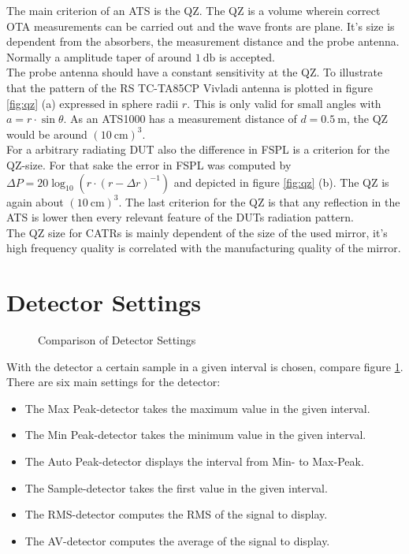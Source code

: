The main criterion of an \ac{ATS} is the \ac{QZ}. The \ac{QZ} is a volume wherein correct \ac{OTA} measurements can be carried out and the wave fronts are plane. It's size is dependent from the absorbers, the measurement distance and the probe antenna. Normally a amplitude taper of around $\SI{1}{\decibel}$ is accepted.\\
The probe antenna should have a constant sensitivity at the \ac{QZ}. To illustrate that the pattern of the \ac{RS} TC-TA85CP Vivladi antenna is plotted in figure \ref{fig:qz} (a) expressed in sphere radii $r$. This is only valid for small angles with $a=r\cdot\sin \theta$. As an ATS1000 has a measurement distance of $d = \SI{0.5}{\meter}$, the \ac{QZ} would be around $\left(\SI{10}{\centi\meter}\right)^3$.\\
For a arbitrary radiating \ac{DUT} also the difference in \ac{FSPL} is a criterion for the \ac{QZ}-size. For that sake the error in \ac{FSPL} was computed by $\Delta P = 20\log_{10}\left(r\cdot\left(r-\Delta r\right)^{-1}\right)$ and depicted in figure \ref{fig:qz} (b). The \ac{QZ} is again about $\left(\SI{10}{\centi\meter}\right)^3$. The last criterion for the \ac{QZ} is that any reflection in the \ac{ATS} is lower then every relevant feature of the \ac{DUT}s radiation pattern.\cite{ach}\\
The \ac{QZ} size for \acp{CATR} is mainly dependent of the size of the used mirror, it's high frequency quality is correlated with the manufacturing quality of the mirror.

\section{Detector Settings}

\begin{figure}[h]
\centering
\def\svgwidth{0.7\textwidth}

\caption{Comparison of Detector Settings \cite{funsspec}}
\label{fig:detset}
\end{figure}

With the detector a certain sample in a given interval is chosen, compare figure \ref{fig:detset}. There are six main settings for the detector: \cite{funsspec}
\begin{itemize}
\item The \textcolor[RGB]{237,28,36}{Max Peak-detector} takes the maximum value in the given interval.
\item The \textcolor[RGB]{0,166,88}{Min Peak-detector} takes the minimum value in the given interval.
\item The \textcolor[RGB]{0,94,138}{Auto Peak-detector} displays the interval from Min- to Max-Peak.
\item The \textcolor[RGB]{0,173,239}{Sample-detector} takes the first value in the given interval.
\item The \textcolor[RGB]{246,135,18}{RMS-detector} computes the \ac{RMS} of the signal to display.
\item The \textcolor[RGB]{114,100,184}{AV-detector} computes the average of the signal to display.
\end{itemize}

